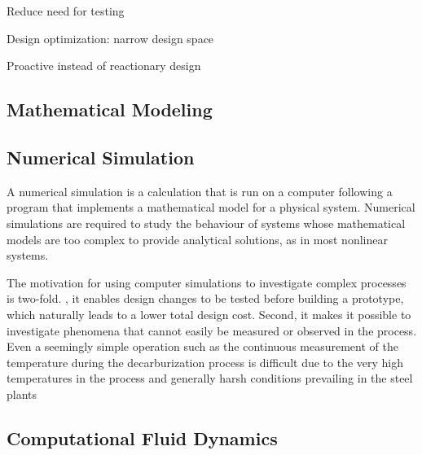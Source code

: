 Reduce need for testing

Design optimization: narrow design space

Proactive instead of reactionary design

\subsection{Mathematical Modeling}

\subsection{Numerical Simulation}

A numerical simulation is a calculation that is run on a computer following a program that implements a mathematical model for a physical system. Numerical simulations are required to study the behaviour of systems whose mathematical models are too complex to provide analytical solutions, as in most nonlinear systems.

The motivation for using computer simulations to investigate complex processes is two-fold. , it enables design changes to be tested before building a prototype, which naturally leads to a lower total design cost. Second, it makes it possible to investigate phenomena that cannot easily be measured or observed in the process. Even a seemingly simple operation such as the continuous measurement of the temperature during the decarburization process is difficult due to the very high temperatures in the process and generally harsh conditions prevailing in the steel plants

\subsection{Computational Fluid Dynamics}

